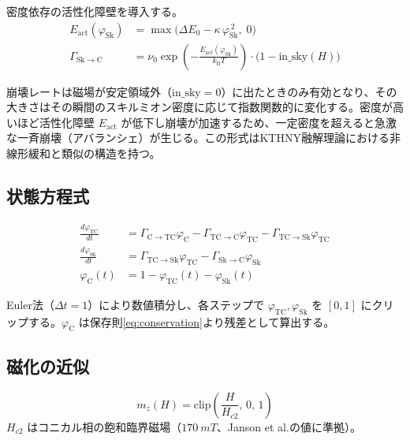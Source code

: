 \documentclass[11pt,a4paper]{ltjsarticle}
\begin{document}
密度依存の活性化障壁を導入する。
\begin{align}
E_\mathrm{act}(\varphi_\mathrm{Sk}) &= \max\bigl(\Delta E_0 - \kappa\,\varphi_\mathrm{Sk}^{\,2},\; 0\bigr) \label{eq:eact}\\
\Gamma_{\mathrm{Sk}\to\mathrm{C}} &= \nu_0 \exp\!\left(-\frac{E_\mathrm{act}(\varphi_\mathrm{Sk})}{k_\mathrm{B}T}\right) \cdot \bigl(1 - \mathrm{in\_sky}(H)\bigr) \label{eq:rate_skc}
\end{align}

崩壊レートは磁場が安定領域外（$\mathrm{in\_sky}=0$）に出たときのみ有効となり、その大きさはその瞬間のスキルミオン密度に応じて指数関数的に変化する。密度が高いほど活性化障壁 $E_\mathrm{act}$ が低下し崩壊が加速するため、一定密度を超えると急激な一斉崩壊（アバランシェ）が生じる。この形式はKTHNY融解理論における非線形緩和と類似の構造を持つ。

\subsection{状態方程式}

\begin{align}
\frac{d\varphi_\mathrm{TC}}{dt} &= \Gamma_{\mathrm{C}\to\mathrm{TC}}\varphi_\mathrm{C} - \Gamma_{\mathrm{TC}\to\mathrm{C}}\varphi_\mathrm{TC} - \Gamma_{\mathrm{TC}\to\mathrm{Sk}}\varphi_\mathrm{TC} \label{eq:dphitc}\\
\frac{d\varphi_\mathrm{Sk}}{dt} &= \Gamma_{\mathrm{TC}\to\mathrm{Sk}}\varphi_\mathrm{TC} - \Gamma_{\mathrm{Sk}\to\mathrm{C}}\varphi_\mathrm{Sk} \label{eq:dphisk}\\
\varphi_\mathrm{C}(t) &= 1 - \varphi_\mathrm{TC}(t) - \varphi_\mathrm{Sk}(t) \label{eq:phic}
\end{align}

Euler法（$\Delta t = 1$）により数値積分し、各ステップで $\varphi_\mathrm{TC}, \varphi_\mathrm{Sk}$ を $[0,1]$ にクリップする。$\varphi_\mathrm{C}$ は保存則\eqref{eq:conservation}より残差として算出する。

\subsection{磁化の近似}

\begin{equation}
m_z(H) = \mathrm{clip}\left(\frac{H}{H_{c2}},\, 0,\, 1\right)
\label{eq:mz}
\end{equation}
$H_{c2}$ はコニカル相の飽和臨界磁場（$\SI{170}{mT}$、Janson et al.\cite{janson2014}の値に準拠）。
\end{document}
